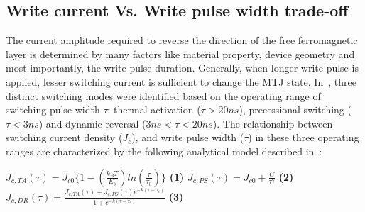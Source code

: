 \subsection{Write current Vs. Write pulse width trade-off} \label{subsec:ict}


The current amplitude required to reverse the direction of the free ferromagnetic layer is determined
by many factors like material property, device geometry and most importantly, the write pulse
duration. Generally, when longer write pulse is applied, lesser switching current is sufficient to 
change the MTJ state. In~\cite{STTRAM:JAP07}, three distinct switching modes were identified 
based on the operating range of switching pulse width $\tau$: thermal activation ($\tau>20ns$),
precessional switching ($\tau<3ns$) and dynamic reversal ($3ns<\tau<20ns$). The relationship between switching current density ($J_{c}$), and write pulse width ($\tau$) in these
three operating ranges are characterized by the following analytical model described in~\cite{STTRAM:IEDM09}:

 {
 \small{
\noindent $J_{c,TA}(\tau) = J_{c0}\{1- (\frac{k_{B}T}{E_{b}})ln(\frac{\tau}{\tau_{0}})\}$ 
\hspace{1mm} \textbf{(1)} \hspace{1mm} $J_{c,PS}(\tau) = J_{c0}+ \frac{C}{\tau^{\gamma}}$ 
\hspace{1mm} \textbf{(2)} \hspace{1mm} $J_{c,DR}(\tau) =
\frac{J_{c,TA}(\tau)+J_{c,PS}(\tau)e^{-k(\tau - \tau_{c})}}{1+e^{-k(\tau - \tau_{c})}}$ \hspace{1mm}
\textbf{(3)}
 }
 }

